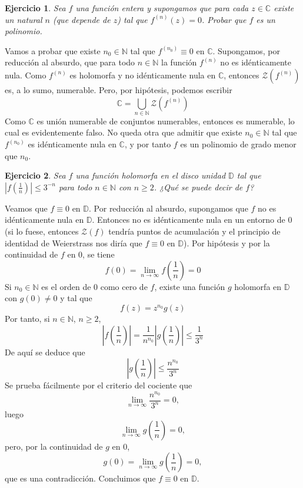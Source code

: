 \documentclass[11pt]{report}
\makeatletter
\renewenvironment{proof}[1][\proofname]{\par
  \pushQED{\qed}%
  \normalfont \topsep\z@skip %
  \trivlist
  \item[\hskip\labelsep
        \itshape
    #1\@addpunct{.}]\ignorespaces
}{%
  \popQED\endtrivlist\@endpefalse
}
\newcommand{\N}{\mathbb N}
\newcommand{\C}{\mathbb C}
\newcommand{\D}{\mathbb D}
\newtheorem{ejercicio}{Ejercicio}
\makeatother
\begin{document}
\begin{ejercicio}
  Sea $f$ una función entera y supongamos que para cada $z \in \C$ existe un natural $n$ (que depende de $z$) tal que $f^{(n)}(z) =0$. Probar que $f$ es un polinomio.
\end{ejercicio}

\begin{proof}
Vamos a probar que existe $n_0 \in \N$ tal que $f^{(n_0)} \equiv 0$ en $\C$. Supongamos, por reducción al absurdo, que para todo $n \in \N$ la función $f^{(n)}$ no es idénticamente nula. Como $f^{(n)}$ es holomorfa y no idénticamente nula en $\C$, entonces $\mathcal{Z}(f^{(n)})$ es, a lo sumo, numerable. Pero, por hipótesis, podemos escribir
\[\C = \bigcup_{n \in \N} \mathcal{Z}(f^{(n)})\]
Como $\C$ es unión numerable de conjuntos numerables, entonces es numerable, lo cual es evidentemente falso. No queda otra que admitir que existe $n_0 \in \N$ tal que $f^{(n_0)}$ es idénticamente nula en $\C$, y por tanto $f$ es un polinomio de grado menor que $n_0$.
\end{proof}

\begin{ejercicio}
  Sea $f$ una función holomorfa en el disco unidad $\D$ tal que $|f(\frac{1}{n})| \leq 3^{-n}$ para todo $n \in \N$ con $n \geq 2$. ¿Qué se puede decir de $f$?
\end{ejercicio}

\begin{proof}
  Veamos que $f \equiv 0$ en $\D$. Por reducción al absurdo, supongamos que $f$ no es idénticamente nula en $\D$. Entonces no es idénticamente nula en un entorno de $0$ (si lo fuese, entonces $\mathcal{Z}(f)$ tendría puntos de acumulación y el principio de identidad de Weierstrass nos diría que $f \equiv 0$ en $\D$). Por hipótesis y por la continuidad de $f$ en $0$, se tiene
  \[f(0) = \lim_{n \to \infty}f\left(\frac{1}{n}\right) = 0\] 
  Si $n_0 \in \N$ es el orden de $0$ como cero de $f$, existe una función $g$ holomorfa en $\D$ con $g(0) \neq 0$ y tal que
  \[f(z)=z^{n_0}g(z)\]
  Por tanto, si $n \in \N$, $n \geq 2$,
  \[\left|f\left(\frac{1}{n}\right)\right| = \frac{1}{n^{n_0}}\left|g\left(\frac{1}{n}\right)\right|\leq \frac{1}{3^n}\]
  De aquí se deduce que
  \[\left|g\left(\frac{1}{n}\right)\right| \leq \frac{n^{n_0}}{3^n}\]
  Se prueba fácilmente por el criterio del cociente que
  \[\lim_{n \to \infty} \frac{n^{n_0}}{3^n} = 0,\]
  luego
  \[\lim_{n \to \infty} g\left(\frac{1}{n}\right) =0,\]
  pero, por la continuidad de $g$ en $0$,
  \[g(0)= \lim_{n \to \infty} g\left(\frac{1}{n}\right) = 0,\]
  que es una contradicción. Concluimos que $f \equiv 0$ en $\D$.
\end{proof}
\end{document}
